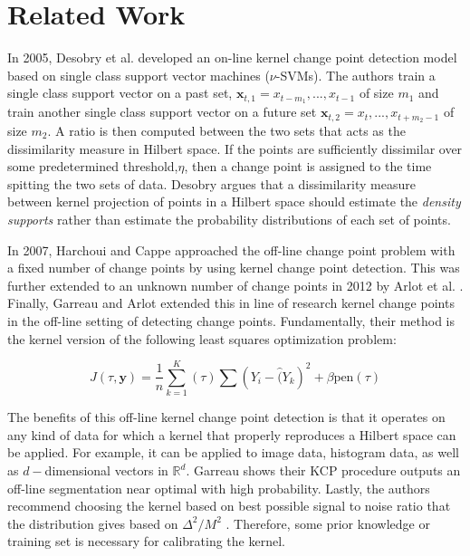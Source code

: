 \section{Related Work}

In 2005, Desobry et al. \cite{desobry2005online} developed an on-line kernel change point detection model based on single class support vector machines ($\nu$-SVMs). The authors train a single class support vector on a past set, $\mathbf{x}_{t,1}={x_{t-m_1},...,x_{t-1}}$ of size $m_1$ and train another single class support vector on a future set $\mathbf{x}_{t,2}={x_t,...,x_{t+m_2-1}}$ of size $m_2$. A ratio is then computed between the two sets that acts as the dissimilarity measure in Hilbert space. If the points are sufficiently dissimilar over some predetermined threshold,$\eta$, then a change point is assigned to the time spitting the two sets of data. Desobry argues that a dissimilarity measure between kernel projection of points in a Hilbert space should estimate the \textit{density supports} rather than estimate the probability distributions of each set of points. 

In 2007, Harchoui and Cappe \cite{harchaoui2007retrospective} approached the off-line change point problem with a fixed number of change points by using kernel change point detection. This was further extended to an unknown number of change points in 2012 by Arlot et al. \cite{arlot2012kernel}. Finally, Garreau and Arlot extended this in line of research kernel change points in the off-line setting of detecting change points. Fundamentally, their method is the kernel version of the following least squares optimization problem:

\begin{equation}
J(\tau, \mathbf{y}) = \frac{1}{n} \sum_{k=1}^K(\tau) \sum (Y_i - \hat(Y_k)^2 + \beta \text{pen}(\tau)
\end{equation}


The benefits of this off-line kernel change point detection is that it operates on any kind of data for which a kernel that properly reproduces a Hilbert space can be applied. For example, it can be applied to image data, histogram data, as well as $d-$dimensional vectors in $\mathbb{R}^d$. Garreau shows their KCP procedure outputs an off-line segmentation near optimal with high probability. Lastly, the authors recommend choosing the kernel based on best possible signal to noise ratio that the distribution gives based on $ \Delta^2 / M^2$ . Therefore, some prior knowledge or training set is necessary for calibrating the kernel. 

